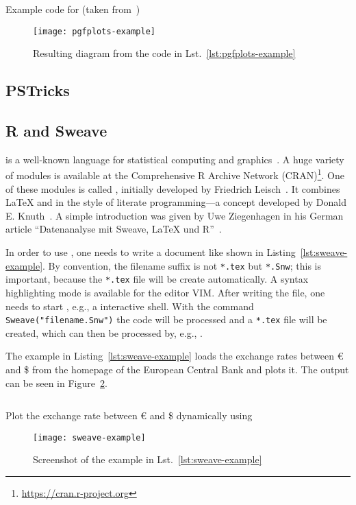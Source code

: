 \begin{listing}[H]
  \inputminted{latex}{../examples/pgfplots-example.tex}
  \caption{Example code for  (taken
    from~\cite{Feuersaenger2016})}
  \label{lst:pgfplots-example}
\end{listing}
\begin{figure}[!t]
  \centering
  \texttt{[image: pgfplots-example]}
  \caption{Resulting diagram from the code in Lst.~\ref{lst:pgfplots-example}}
  \label{fig:pgfplots-example}
\end{figure}

\subsection{PSTricks}

\subsection{R and Sweave}

 is a well-known language for statistical computing and
graphics~\cite{Ihaka1998}.  A huge variety of modules is available at the
Comprehensive R Archive Network (CRAN)\footnote{%
  \href{https://cran.r-project.org}{https://cran.r-project.org}}.  One of these
modules is called , initially developed by Friedrich
Leisch~\cite{Leisch2002}.  It combines \LaTeX{} and  in the style of
literate programming—a concept developed by Donald E\@. Knuth~\cite{Knuth1992}.
A simple introduction was given by Uwe Ziegenhagen in his German article
\enquote{Datenanalyse mit Sweave, \LaTeX{} und R}~\cite{Ziegenhagen2010}.

In order to use , one needs to write a document like shown in
Listing~\ref{lst:sweave-example}.  By convention, the filename suffix is not
\texttt{*.tex} but \texttt{*.Snw}; this is important, because the \texttt{*.tex}
file will be create automatically.  A syntax highlighting mode is available for
the editor VIM\@.  After writing the file, one needs to start ,
e.g., a  interactive shell.  With the command
\texttt{Sweave("filename.Snw")} the  code will be processed
and a \texttt{*.tex} file will be created, which can then be processed by, e.g.,
.

The example in Listing~\ref{lst:sweave-example} loads the exchange rates between
\euro{} and \$ from the homepage of the European Central Bank and plots it. The
output can be seen in Figure~\ref{fig:sweave-example}.

\begin{listing}[H]
  \inputminted{latex}{../examples/sweave-example.Snw}
  \caption{Plot the exchange rate between \euro{} and \$ dynamically using
    }
  \label{lst:sweave-example}
\end{listing}
\begin{figure}[!t]
  \texttt{[image: sweave-example]}
  \caption{Screenshot of the  example in
    Lst.~\ref{lst:sweave-example}}
  \label{fig:sweave-example}
\end{figure}
